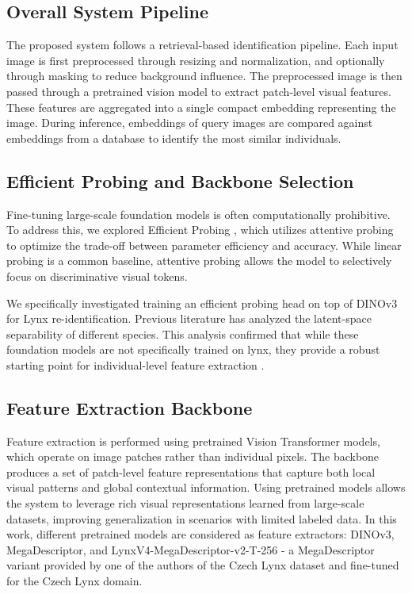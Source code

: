 \documentclass{article}
\begin{document}
\subsection{Overall System Pipeline}
The proposed system follows a retrieval-based identification pipeline. Each input image is first preprocessed through resizing and normalization, and optionally through masking to reduce background influence. The preprocessed image is then passed through a pretrained vision model to extract patch-level visual features. These features are aggregated into a single compact embedding representing the image. During inference, embeddings of query images are compared against embeddings from a database to identify the most similar individuals.

\subsection{Efficient Probing and Backbone Selection}
Fine-tuning large-scale foundation models is often computationally prohibitive. To address this, we explored Efficient Probing \cite{psomas2025efficientprobing}, which utilizes attentive probing to optimize the trade-off between parameter efficiency and accuracy. While linear probing is a common baseline, attentive probing allows the model to selectively focus on discriminative visual tokens. 

We specifically investigated training an efficient probing head on top of DINOv3 \cite{Simeoni2025DINOv3} for Lynx re-identification. Previous literature has analyzed the latent-space separability of different species. This analysis confirmed that while these foundation models are not specifically trained on lynx, they provide a robust starting point for individual-level feature extraction \cite{Cermak_2024_WACV}. 

\subsection{Feature Extraction Backbone}
Feature extraction is performed using pretrained Vision Transformer models, which operate on image patches rather than individual pixels. The backbone produces a set of patch-level feature representations that capture both local visual patterns and global contextual information. Using pretrained models allows the system to leverage rich visual representations learned from large-scale datasets, improving generalization in scenarios with limited labeled data. In this work, different pretrained models are considered as feature extractors: DINOv3, MegaDescriptor, and LynxV4-MegaDescriptor-v2-T-256 \cite{lynx_megadescriptor} - a MegaDescriptor variant provided by one of the authors of the Czech Lynx dataset and fine-tuned for the Czech Lynx domain.
\end{document}

